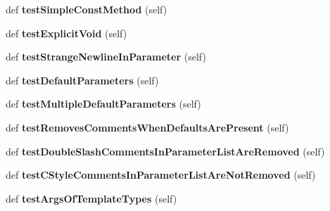\begin{DoxyCompactItemize}
def {\bfseries test\+Simple\+Const\+Method} (self)
\item 
\mbox{\label{classcpp_1_1gmock__class__test_1_1_generate_methods_test_a4db373bb8953d0523425b5a3f392e761}} 
def {\bfseries test\+Explicit\+Void} (self)
\item 
\mbox{\label{classcpp_1_1gmock__class__test_1_1_generate_methods_test_a184995b077a46f3408fa203cb0626614}} 
def {\bfseries test\+Strange\+Newline\+In\+Parameter} (self)
\item 
\mbox{\label{classcpp_1_1gmock__class__test_1_1_generate_methods_test_a61abb614ad02a1fef3ece3813695c22a}} 
def {\bfseries test\+Default\+Parameters} (self)
\item 
\mbox{\label{classcpp_1_1gmock__class__test_1_1_generate_methods_test_a41b91cc39a55385b8c4b97d804e80345}} 
def {\bfseries test\+Multiple\+Default\+Parameters} (self)
\item 
\mbox{\label{classcpp_1_1gmock__class__test_1_1_generate_methods_test_add445941c6503198f0c3a25e00d20b9f}} 
def {\bfseries test\+Removes\+Comments\+When\+Defaults\+Are\+Present} (self)
\item 
\mbox{\label{classcpp_1_1gmock__class__test_1_1_generate_methods_test_abb9fce46de4ac1d2943b85e84ce14c83}} 
def {\bfseries test\+Double\+Slash\+Comments\+In\+Parameter\+List\+Are\+Removed} (self)
\item 
\mbox{\label{classcpp_1_1gmock__class__test_1_1_generate_methods_test_afa44c6ac675ce7454ff0f51164bde59e}} 
def {\bfseries test\+C\+Style\+Comments\+In\+Parameter\+List\+Are\+Not\+Removed} (self)
\item 
\mbox{\label{classcpp_1_1gmock__class__test_1_1_generate_methods_test_ade05313ccffe74f9eaa42fb66c14f702}} 
def {\bfseries test\+Args\+Of\+Template\+Types} (self)

\end{DoxyCompactItemize}
